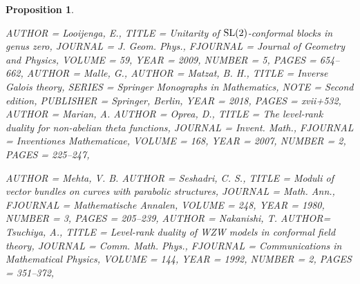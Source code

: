 \documentclass[11pt]{amsart}
\newtheorem{proposition}[theorem]{Proposition}
\numberwithin{theorem}{subsection}
\begin{document}
{\begin{proposition}
\begin{bibdiv}
\begin{biblist}
 {
    AUTHOR = {Looijenga, E.},
     TITLE = {Unitarity of {${\rm SL}(2)$}-conformal blocks in genus zero},
   JOURNAL = {J. Geom. Phys.},
  FJOURNAL = {Journal of Geometry and Physics},
    VOLUME = {59},
      YEAR = {2009},
    NUMBER = {5},
     PAGES = {654--662},
}
 {
    AUTHOR = {Malle, G.},
    AUTHOR = {Matzat, B. H.},
     TITLE = {Inverse {G}alois theory},
    SERIES = {Springer Monographs in Mathematics},
      NOTE = {Second edition},
 PUBLISHER = {Springer, Berlin},
      YEAR = {2018},
     PAGES = {xvii+532},
}
 {
    AUTHOR = {Marian, A.}
    AUTHOR = {Oprea, D.},
     TITLE = {The level-rank duality for non-abelian theta functions},
   JOURNAL = {Invent. Math.},
  FJOURNAL = {Inventiones Mathematicae},
    VOLUME = {168},
      YEAR = {2007},
    NUMBER = {2},
     PAGES = {225--247},
}
	



 {
    AUTHOR = {Mehta, V. B.}
    AUTHOR = {Seshadri, C. S.},
     TITLE = {Moduli of vector bundles on curves with parabolic structures},
   JOURNAL = {Math. Ann.},
  FJOURNAL = {Mathematische Annalen},
    VOLUME = {248},
      YEAR = {1980},
    NUMBER = {3},
     PAGES = {205--239},
}
 {
    AUTHOR = {Nakanishi, T.}
    AUTHOR=  {Tsuchiya, A.},
     TITLE = {Level-rank duality of {WZW} models in conformal field theory},
   JOURNAL = {Comm. Math. Phys.},
  FJOURNAL = {Communications in Mathematical Physics},
    VOLUME = {144},
      YEAR = {1992},
    NUMBER = {2},
     PAGES = {351--372},
}


\end{biblist}
\end{bibdiv}
\end{proposition}}
\end{document}
